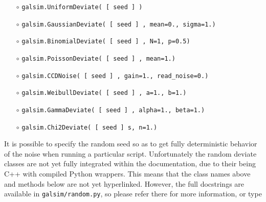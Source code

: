 \documentclass[preprint,11pt]{aastex}
\begin{document}
\begin{itemize}

\item[$\circ$] \texttt{galsim.UniformDeviate( [ seed ] )} \newline {uniform distribution in the
  interval $[0, 1)$.}

\item[$\circ$] \texttt{galsim.GaussianDeviate( [ seed ] , mean=0., sigma=1.)} 

\item[$\circ$] \texttt{galsim.BinomialDeviate( [ seed ] , N=1, p=0.5)} 

\item[$\circ$] \texttt{galsim.PoissonDeviate( [ seed ] , mean=1.)} 

\item[$\circ$] \texttt{galsim.CCDNoise( [ seed ] , gain=1., read\_noise=0.)}  

\item[$\circ$] \texttt{galsim.WeibullDeviate( [ seed ] , a=1., b=1.)} 

\item[$\circ$] \texttt{galsim.GammaDeviate( [ seed ] , alpha=1., beta=1.)} 

\item[$\circ$] \texttt{galsim.Chi2Deviate( [ seed ] s, n=1.)} 

\end{itemize}

It is possible to specify the random seed so as to get fully
deterministic behavior of the noise when running a particular script.
Unfortunately the random deviate classes are not yet fully integrated
within the documentation, due to their being C++ with compiled Python
wrappers.  This means that the class names above and methods below are
not yet hyperlinked.  However, the full docstrings are available in
\texttt{galsim/random.py}, so please refer there for more information,
or type
\end{document}
